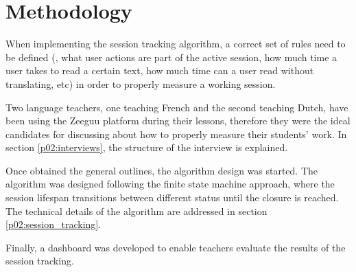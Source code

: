 \chapter{Methodology}\label{p02:implementation}
When implementing the session tracking algorithm, a correct set of rules need to be defined (\eg, what user actions are part of the active session, how much time a user takes to read a certain text, how much time can a user read without translating, etc) in order to properly measure a working session.

Two language teachers, one teaching French and the second teaching Dutch, have been using the Zeeguu platform during their lessons, therefore they were the ideal candidates for discussing about how to properly measure their students' work. In section \ref{p02:interviews}, the structure of the interview is explained.

Once obtained the general outlines, the algorithm design was started. The algorithm was designed following the finite state machine approach, where the session lifespan transitions between different status until the closure is reached. The technical details of the algorithm are addressed in section \ref{p02:session_tracking}.

Finally, a dashboard was developed to enable teachers evaluate the results of the session tracking.
